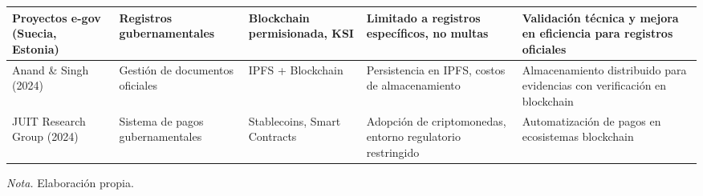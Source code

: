 \begin{table}[htbp]
\begin{tabular}{p{2.8cm} p{2.5cm} p{2.5cm} p{2.8cm} p{3.5cm}}
        \midrule
        Proyectos e-gov (Suecia, Estonia) & Registros gubernamentales & Blockchain permisionada, KSI & Limitado a registros específicos, no multas & Validación técnica y mejora en eficiencia para registros oficiales \\
        \midrule
        Anand \& Singh (2024) & Gestión de documentos oficiales & IPFS + Blockchain & Persistencia en IPFS, costos de almacenamiento & Almacenamiento distribuido para evidencias con verificación en blockchain \\
        \midrule
        JUIT Research Group (2024) & Sistema de pagos gubernamentales & Stablecoins, Smart Contracts & Adopción de criptomonedas, entorno regulatorio restringido & Automatización de pagos en ecosistemas blockchain \\
        \bottomrule
    \end{tabular}
    \vspace{2em}
    \begin{flushleft}
        \textit{Nota.} Elaboración propia.
    \end{flushleft}
    \label{tab:estado_arte_comparativo}
\end{table}

